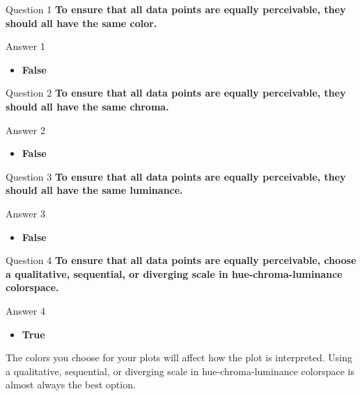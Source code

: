 \documentclass[
  ignorenonframetext,
]{beamer}
\providecommand{\tightlist}{%
  \setlength{\itemsep}{0pt}\setlength{\parskip}{0pt}}
\begin{document}
\begin{frame}{Question 1}
\label{question-1}
\textbf{To ensure that all data points are equally perceivable, they
should all have the same color.}
\end{frame}

\begin{frame}{Answer 1}
\label{answer-1}
\begin{itemize}
\tightlist
\item
  \textbf{False}
\end{itemize}
\end{frame}

\begin{frame}{Question 2}
\label{question-2}
\textbf{To ensure that all data points are equally perceivable, they
should all have the same chroma.}
\end{frame}

\begin{frame}{Answer 2}
\label{answer-2}
\begin{itemize}
\tightlist
\item
  \textbf{False}
\end{itemize}
\end{frame}

\begin{frame}{Question 3}
\label{question-3}
\textbf{To ensure that all data points are equally perceivable, they
should all have the same luminance.}
\end{frame}

\begin{frame}{Answer 3}
\label{answer-3}
\begin{itemize}
\tightlist
\item
  \textbf{False}
\end{itemize}
\end{frame}

\begin{frame}{Question 4}
\label{question-4}
\textbf{To ensure that all data points are equally perceivable, choose a
qualitative, sequential, or diverging scale in hue-chroma-luminance
colorspace.}
\end{frame}

\begin{frame}{Answer 4}
\label{answer-4}
\begin{itemize}
\tightlist
\item
  \textbf{True}
\end{itemize}

The colors you choose for your plots will affect how the plot is
interpreted. Using a qualitative, sequential, or diverging scale in
hue-chroma-luminance colorspace is almost always the best option.
\end{frame}
\end{document}
